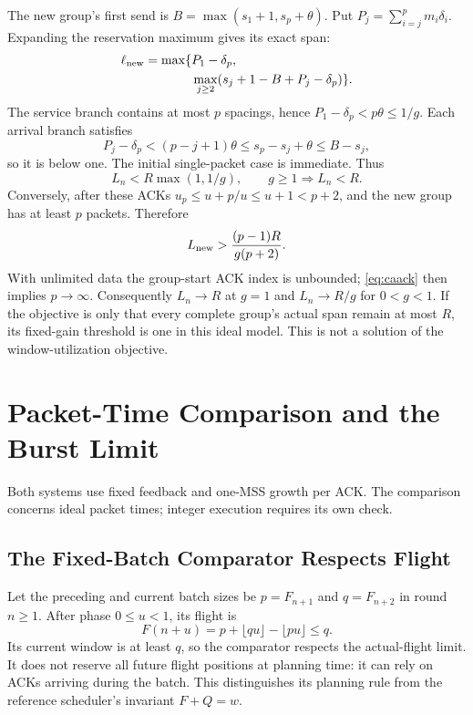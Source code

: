 \documentclass[sigconf,nonacm]{acmart}
\begin{document}
The new group's first send is $B=\max(s_1+1,s_p+\theta)$. Put $P_j=\sum_{i=j}^p m_i\delta_i$. Expanding the reservation maximum gives its exact span:
\begin{equation}\begin{aligned}
 \ell_{\rm new}=\max\{&P_1-\delta_p,\\
 &\max_{j\ge2}(s_j+1-B+P_j-\delta_p)\}.
 \label{eq:camaxspan}
\end{aligned}\end{equation}
The service branch contains at most $p$ spacings, hence $P_1-\delta_p<p\theta\le1/g$. Each arrival branch satisfies
\[
 P_j-\delta_p<(p-j+1)\theta
 \le s_p-s_j+\theta\le B-s_j,
\]
so it is below one. The initial single-packet case is immediate. Thus
\begin{equation}
 L_n<R\max(1,1/g),\qquad g\ge1\Rightarrow L_n<R.
 \label{eq:caspupper}
\end{equation}
Conversely, after these ACKs $u_p\le u+p/u\le u+1<p+2$, and the new group has at least $p$ packets. Therefore
\begin{equation}
 L_{\rm new}>\frac{(p-1)R}{g(p+2)}.
 \label{eq:casplower}
\end{equation}
With unlimited data the group-start ACK index is unbounded; \eqref{eq:caack} then implies $p\to\infty$. Consequently $L_n\to R$ at $g=1$ and $L_n\to R/g$ for $0<g<1$. If the objective is only that every complete group's actual span remain at most $R$, its fixed-gain threshold is one in this ideal model. This is not a solution of the window-utilization objective.

\section{Packet-Time Comparison and the Burst Limit}\label{app:comparison}
Both systems use fixed feedback and one-MSS growth per ACK. The comparison concerns ideal packet times; integer execution requires its own check.

\subsection{The Fixed-Batch Comparator Respects Flight}
Let the preceding and current batch sizes be $p=F_{n+1}$ and $q=F_{n+2}$ in round $n\ge1$. After phase $0\le u<1$, its flight is
\begin{equation}
 F(n+u)=p+\lfloor qu\rfloor-\lfloor pu\rfloor\le q.
\end{equation}
Its current window is at least $q$, so the comparator respects the actual-flight limit. It does not reserve all future flight positions at planning time: it can rely on ACKs arriving during the batch. This distinguishes its planning rule from the reference scheduler's invariant $F+Q=w$.
\end{document}
